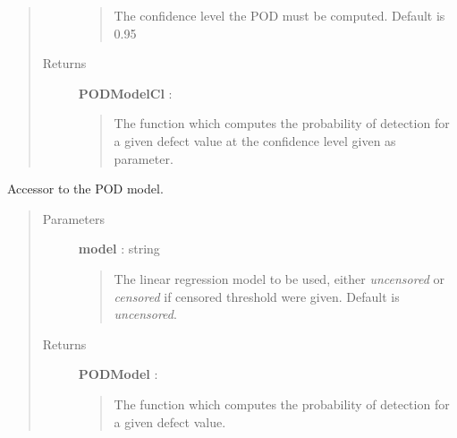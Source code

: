 \documentclass[letterpaper,10pt,english]{sphinxmanual}
\begin{document}
\begin{fulllineitems}
\begin{fulllineitems}
\begin{quote}
\begin{description}
\begin{quote}
The confidence level the POD must be computed. Default is 0.95
\end{quote}

\item[{Returns}] \leavevmode
\textbf{PODModelCl} : \href{http://doc.openturns.org/openturns-latest/sphinx/user\_manual/\_generated/openturns.NumericalMathFunction.html\#openturns.NumericalMathFunction}{}
\begin{quote}

The function which computes the probability of detection for a given
defect value at the confidence level given as parameter.
\end{quote}

\end{description}\end{quote}

\end{fulllineitems}


\begin{fulllineitems}
\label{_generated/otpod.UnivariateLinearModelPOD:otpod.UnivariateLinearModelPOD.getPODModel}
Accessor to the POD model.
\begin{quote}\begin{description}
\item[{Parameters}] \leavevmode
\textbf{model} : string
\begin{quote}

The linear regression model to be used, either \emph{uncensored} or
\emph{censored} if censored threshold were given. Default is \emph{uncensored}.
\end{quote}

\item[{Returns}] \leavevmode
\textbf{PODModel} : \href{http://doc.openturns.org/openturns-latest/sphinx/user\_manual/\_generated/openturns.NumericalMathFunction.html\#openturns.NumericalMathFunction}{}
\begin{quote}

The function which computes the probability of detection for a given
defect value.
\end{quote}

\end{description}\end{quote}


\end{fulllineitems}
\end{fulllineitems}
\end{document}
